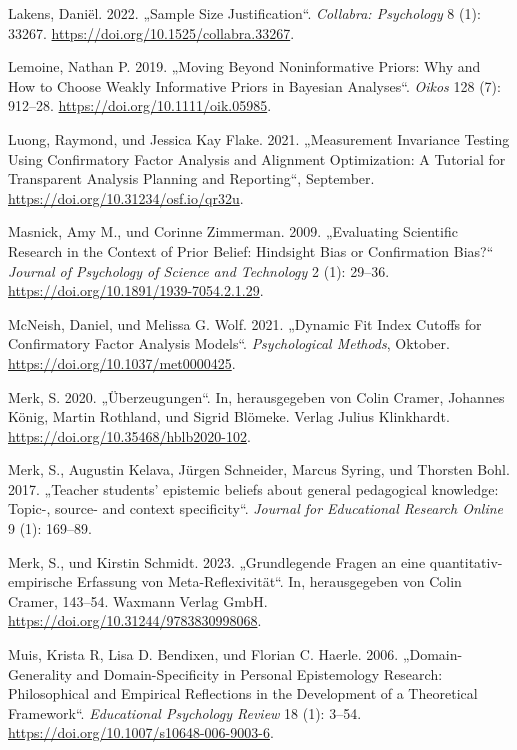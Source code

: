 \documentclass[
  letterpaper,
  DIV=11]{scrartcl}
\newlength{\cslhangindent}
\newenvironment{CSLReferences}[2] %
 {\begin{list}{}{%
  \setlength{\itemindent}{0pt}
  \setlength{\leftmargin}{0pt}
  \setlength{\parsep}{0pt}
  \ifodd #1
   \setlength{\leftmargin}{\cslhangindent}
   \setlength{\itemindent}{-1\cslhangindent}
  \fi
  \setlength{\itemsep}{#2\baselineskip}}}
 {\end{list}}
\begin{document}
\begin{CSLReferences}{1}{0}
Lakens, Daniël. 2022. {„Sample Size Justification``}. \emph{Collabra:
Psychology} 8 (1): 33267. \url{https://doi.org/10.1525/collabra.33267}.

Lemoine, Nathan P. 2019. {„Moving Beyond Noninformative Priors: Why and
How to Choose Weakly Informative Priors in Bayesian Analyses``}.
\emph{Oikos} 128 (7): 912--28. \url{https://doi.org/10.1111/oik.05985}.

Luong, Raymond, und Jessica Kay Flake. 2021. {„Measurement Invariance
Testing Using Confirmatory Factor Analysis and Alignment Optimization: A
Tutorial for Transparent Analysis Planning and Reporting``}, September.
\url{https://doi.org/10.31234/osf.io/qr32u}.

Masnick, Amy M., und Corinne Zimmerman. 2009. {„Evaluating Scientific
Research in the Context of Prior Belief: {Hindsight} Bias or
Confirmation Bias?``} \emph{Journal of Psychology of Science and
Technology} 2 (1): 29--36.
\url{https://doi.org/10.1891/1939-7054.2.1.29}.

McNeish, Daniel, und Melissa G. Wolf. 2021. {„Dynamic Fit Index Cutoffs
for Confirmatory Factor Analysis Models``}. \emph{Psychological
Methods}, Oktober. \url{https://doi.org/10.1037/met0000425}.

Merk, S. 2020. {„Überzeugungen``}. In, herausgegeben von Colin Cramer,
Johannes König, Martin Rothland, und Sigrid Blömeke. Verlag Julius
Klinkhardt. \url{https://doi.org/10.35468/hblb2020-102}.

Merk, S., Augustin Kelava, Jürgen Schneider, Marcus Syring, und Thorsten
Bohl. 2017. {„Teacher students{'} epistemic beliefs about general
pedagogical knowledge: Topic-, source- and context specificity``}.
\emph{Journal for Educational Research Online} 9 (1): 169--89.

Merk, S., und Kirstin Schmidt. 2023. {„Grundlegende Fragen an eine
quantitativ-empirische Erfassung von Meta-Reflexivität``}. In,
herausgegeben von Colin Cramer, 143--54. Waxmann Verlag GmbH.
\url{https://doi.org/10.31244/9783830998068}.

Muis, Krista R, Lisa D. Bendixen, und Florian C. Haerle. 2006.
{„Domain-Generality and Domain-Specificity in Personal Epistemology
Research: Philosophical and Empirical Reflections in the Development of
a Theoretical Framework``}. \emph{Educational Psychology Review} 18 (1):
3--54. \url{https://doi.org/10.1007/s10648-006-9003-6}.


\end{CSLReferences}
\end{document}
